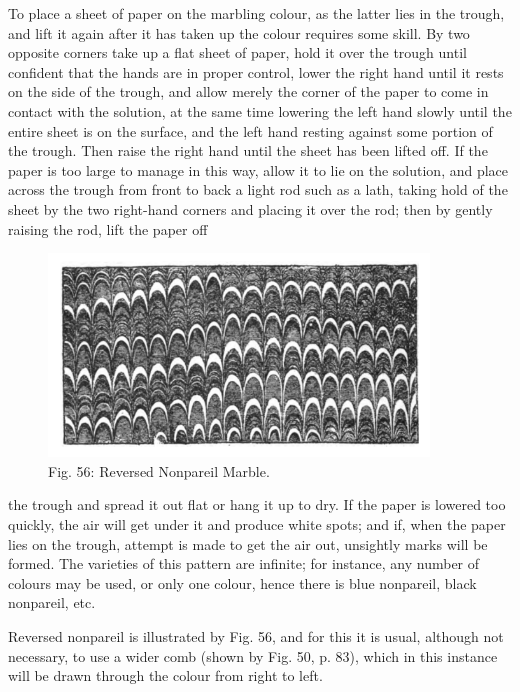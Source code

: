 \documentclass[twoside]{book}
\begin{document}
To place a sheet of paper on the marbling
colour, as the latter lies in the trough, and lift it
again after it has taken up the colour requires
some skill. By two opposite corners take up
a flat sheet of paper, hold it over the trough
until confident that the hands are in proper control,
lower the right hand until it rests on the side
\pagebreak
of the trough, and allow merely the corner of the
paper to come in contact with the solution, at the
same time lowering the left hand slowly until the
entire sheet is on the surface, and the left hand
resting against some portion of the trough. Then
raise the right hand until the sheet has been lifted
off. If the paper is too large to manage in this
way, allow it to lie on the solution, and place
across the trough from front to back a light rod
such as a lath, taking hold of the sheet by the
two right-hand corners and placing it over the rod;
then by gently raising the rod, lift the paper off
	\begin{figure}[h]
		\centering
		\includegraphics[width=0.9\textwidth]{Figures/_056.png}
		\caption*{Fig. 56: Reversed Nonpareil Marble.}
	\end{figure}
the trough and spread it out flat or hang it up to
dry. If the paper is lowered too quickly, the air
will get under it and produce white spots; and if,
when the paper lies on the trough, attempt is made
to get the air out, unsightly marks will be formed.
The varieties of this pattern are infinite; for
instance, any number of colours may be used, or only
one colour, hence there is blue nonpareil, black
nonpareil, etc.

Reversed nonpareil is illustrated by Fig. 56,
and for this it is usual, although not necessary, to use
a wider comb (shown by Fig. 50, p. 83), which in
this instance will be drawn through the colour from
right to left.

\pagebreak
\end{document}
